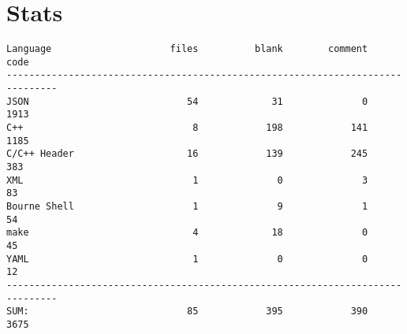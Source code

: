 \documentclass[paper=a4, fontsize=11pt, abstract=on]{scrartcl} %
\numberwithin{equation}{section} %
\numberwithin{figure}{section} %
\numberwithin{table}{section} %
\begin{document}
\section{Stats}

\begin{verbatim}
Language                     files          blank        comment           code
-------------------------------------------------------------------------------
JSON                            54             31              0           1913
C++                              8            198            141           1185
C/C++ Header                    16            139            245            383
XML                              1              0              3             83
Bourne Shell                     1              9              1             54
make                             4             18              0             45
YAML                             1              0              0             12
-------------------------------------------------------------------------------
SUM:                            85            395            390           3675
\end{verbatim}
\end{document}
